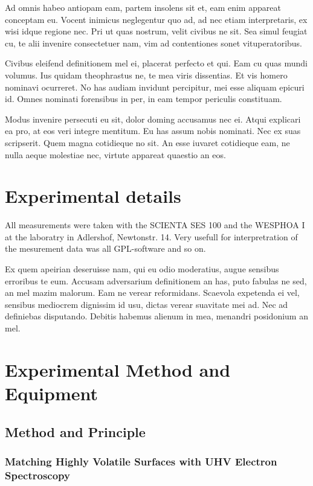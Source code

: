 \documentclass[12pt,oneside,english]{book}
\begin{document}
Ad omnis habeo antiopam eam, partem insolens sit et, eam enim appareat conceptam eu. Vocent inimicus neglegentur quo ad, ad nec etiam interpretaris, ex wisi idque regione nec. Pri ut quas nostrum, velit civibus ne sit. Sea simul feugiat cu, te alii invenire consectetuer nam, vim ad contentiones sonet vituperatoribus.

Civibus eleifend definitionem mel ei, placerat perfecto et qui. Eam cu quas mundi volumus. Ius quidam theophrastus ne, te mea viris dissentias. Et vis homero nominavi ocurreret. No has audiam invidunt percipitur, mei esse aliquam epicuri id. Omnes nominati forensibus in per, in eam tempor periculis constituam.

Modus invenire persecuti eu sit, dolor doming accusamus nec ei. Atqui explicari ea pro, at eos veri integre mentitum. Eu has assum nobis nominati. Nec ex suas scripserit. Quem magna cotidieque no sit. An esse iuvaret cotidieque eam, ne nulla aeque molestiae nec, virtute appareat quaestio an eos.

\chapter{Experimental details}

All measurements were taken with the SCIENTA SES 100 and the WESPHOA
I at the laboratry in Adlershof, Newtonstr. 14. Very usefull for interpretration
of the mesurement data was all GPL-software and so on.

Ex quem apeirian deseruisse nam, qui eu odio moderatius, augue sensibus erroribus te eum. Accusam adversarium definitionem an has, puto fabulas ne sed, an mel mazim malorum. Eam ne verear reformidans. Scaevola expetenda ei vel, sensibus mediocrem dignissim id usu, dictas verear suavitate mei ad. Nec ad definiebas disputando. Debitis habemus alienum in mea, menandri posidonium an mel.



\chapter{Experimental Method and Equipment}
\section{Method and Principle}
\subsection{Matching Highly Volatile Surfaces with UHV Electron Spectroscopy}
\end{document}
